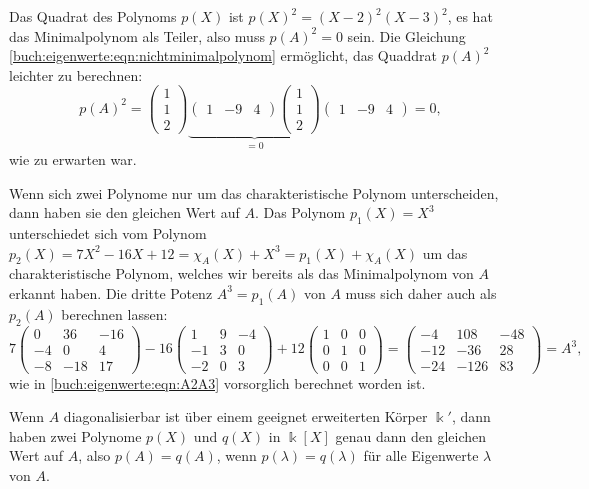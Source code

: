 \begin{beispiel}
Das Quadrat des Polynoms $p(X)$ ist $p(X)^2 = (X-2)^2(X-3)^2$, es hat
das Minimalpolynom als Teiler, also muss $p(A)^2=0$ sein.
Die Gleichung \eqref{buch:eigenwerte:eqn:nichtminimalpolynom} ermöglicht,
das Quaddrat $p(A)^2$ leichter zu berechnen:
\[
p(A)^2
=
\begin{pmatrix}1\\1\\2\end{pmatrix}
\underbrace{
\begin{pmatrix}1&-9&4\end{pmatrix}
\begin{pmatrix}1\\1\\2\end{pmatrix}
}_{\displaystyle = 0}
\begin{pmatrix}1&-9&4\end{pmatrix}
=
0
,
\]
wie zu erwarten war.

Wenn sich zwei Polynome nur um das charakteristische Polynom unterscheiden,
dann haben sie den gleichen Wert auf $A$.
Das Polynom $p_1(X)=X^3$ unterschiedet sich vom Polynom
$p_2(X)=7X^2-16X+12=\chi_A(X)+X^3=p_1(X)+\chi_A(X)$ 
um das charakteristische Polynom, welches wir bereits als das Minimalpolynom
von $A$ erkannt haben.
Die dritte Potenz $A^3=p_1(A)$ von $A$ muss sich daher auch als $p_2(A)$
berechnen lassen:
\[
7
\begin{pmatrix}
  0&  36& -16 \\
 -4&   0&   4 \\
 -8& -18&  17 
\end{pmatrix}
-16
\begin{pmatrix}
   1&  9& -4\\
  -1&  3&  0\\
  -2&  0&  3
\end{pmatrix}
+12
\begin{pmatrix}
1&0&0\\
0&1&0\\
0&0&1
\end{pmatrix}
=
\begin{pmatrix}
 -4& 108&  -48\\
-12& -36&   28\\
-24&-126&   83
\end{pmatrix}
=
A^3,
\]
wie in \eqref{buch:eigenwerte:eqn:A2A3} vorsorglich berechnet worden ist.
\end{beispiel}

\begin{satz}
Wenn $A$ diagonalisierbar ist über einem geeignet erweiterten Körper $\Bbbk'$,
dann haben zwei Polynome $p(X)$ und $q(X)$ in $\Bbbk[X]$ genau dann
den gleichen Wert auf $A$, also $p(A)=q(A)$, wenn $p(\lambda) = q(\lambda)$
für alle Eigenwerte $\lambda$ von $A$.
\end{satz}

